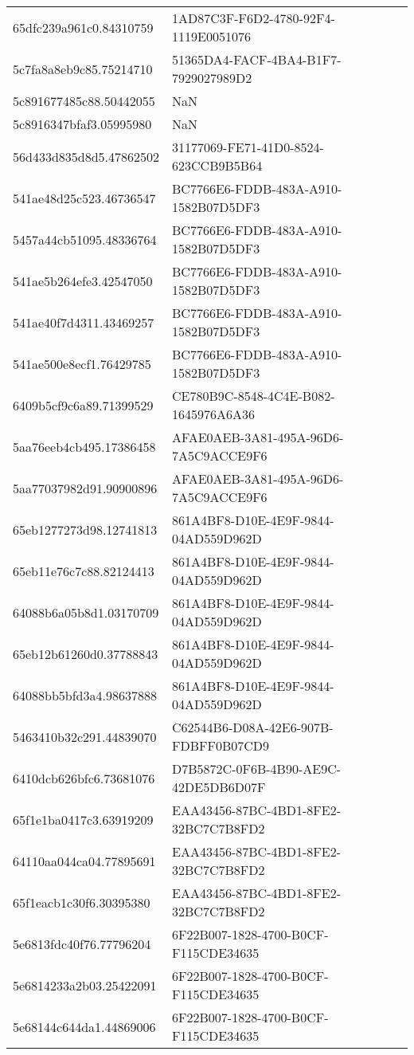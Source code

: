 \begin{tabular}{ll}
65dfc239a961c0.84310759 & 1AD87C3F-F6D2-4780-92F4-1119E0051076 \\
5c7fa8a8eb9c85.75214710 & 51365DA4-FACF-4BA4-B1F7-7929027989D2 \\
5c891677485c88.50442055 & NaN \\
5c8916347bfaf3.05995980 & NaN \\
56d433d835d8d5.47862502 & 31177069-FE71-41D0-8524-623CCB9B5B64 \\
541ae48d25c523.46736547 & BC7766E6-FDDB-483A-A910-1582B07D5DF3 \\
5457a44cb51095.48336764 & BC7766E6-FDDB-483A-A910-1582B07D5DF3 \\
541ae5b264efe3.42547050 & BC7766E6-FDDB-483A-A910-1582B07D5DF3 \\
541ae40f7d4311.43469257 & BC7766E6-FDDB-483A-A910-1582B07D5DF3 \\
541ae500e8ecf1.76429785 & BC7766E6-FDDB-483A-A910-1582B07D5DF3 \\
6409b5cf9c6a89.71399529 & CE780B9C-8548-4C4E-B082-1645976A6A36 \\
5aa76eeb4cb495.17386458 & AFAE0AEB-3A81-495A-96D6-7A5C9ACCE9F6 \\
5aa77037982d91.90900896 & AFAE0AEB-3A81-495A-96D6-7A5C9ACCE9F6 \\
65eb1277273d98.12741813 & 861A4BF8-D10E-4E9F-9844-04AD559D962D \\
65eb11e76c7c88.82124413 & 861A4BF8-D10E-4E9F-9844-04AD559D962D \\
64088b6a05b8d1.03170709 & 861A4BF8-D10E-4E9F-9844-04AD559D962D \\
65eb12b61260d0.37788843 & 861A4BF8-D10E-4E9F-9844-04AD559D962D \\
64088bb5bfd3a4.98637888 & 861A4BF8-D10E-4E9F-9844-04AD559D962D \\
5463410b32c291.44839070 & C62544B6-D08A-42E6-907B-FDBFF0B07CD9 \\
6410dcb626bfc6.73681076 & D7B5872C-0F6B-4B90-AE9C-42DE5DB6D07F \\
65f1e1ba0417c3.63919209 & EAA43456-87BC-4BD1-8FE2-32BC7C7B8FD2 \\
64110aa044ca04.77895691 & EAA43456-87BC-4BD1-8FE2-32BC7C7B8FD2 \\
65f1eacb1c30f6.30395380 & EAA43456-87BC-4BD1-8FE2-32BC7C7B8FD2 \\
5e6813fdc40f76.77796204 & 6F22B007-1828-4700-B0CF-F115CDE34635 \\
5e6814233a2b03.25422091 & 6F22B007-1828-4700-B0CF-F115CDE34635 \\
5e68144c644da1.44869006 & 6F22B007-1828-4700-B0CF-F115CDE34635 \\

\end{tabular}
